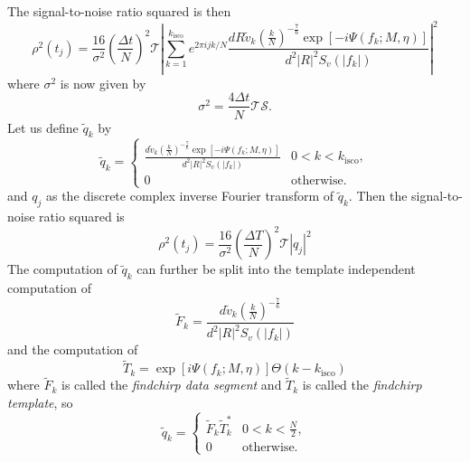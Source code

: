 The signal-to-noise ratio squared is then
\begin{equation}
\rho^2(t_j) = 
\frac{16}{\sigma^2}\left(\frac{\Delta t}{N}\right)^2 \mathcal{T}
\left| 
  \sum_{k=1}^{k_\mathrm{isco}} e^{2\pi ijk/N} 
  \frac{dR\tilde{v}_k \left(\frac{k}{N}\right)^{-\frac{7}{6}} \exp\left[-i\Psi(f_k;M,\eta)\right]}
       {d^2|R|^2 S_v\left(\left|f_k\right|\right)}
\right|^2 
\label{eq:signaltonoisesq}
\end{equation}
where $\sigma^2$ is now given by
\begin{equation}
\sigma^2 = \frac{4\Delta t}{N} \mathcal{T}\mathcal{S}.
\label{eq:sigmasqts}
\end{equation}
Let us define $\tilde{q}_k$ by
\begin{equation}
\label{eq:qtildedef}
\tilde{q}_k = 
\begin{cases}
\frac{d\tilde{v}_k \left(\frac{k}{N}\right)^{-\frac{7}{6}} \exp\left[-i\Psi(f_k;M,\eta)\right]}
     {d^2|R|^2S_v\left(\left|f_k\right|\right)} & 0 < k < k_\mathrm{isco}, \\
0 & \text{otherwise}.
\end{cases}
\end{equation}
and $q_j$ as the discrete complex inverse Fourier transform of $\tilde{q}_k$. Then
the signal-to-noise ratio squared is
\begin{equation}
\rho^2(t_j) = \frac{16}{\sigma^2}\left(\frac{\Delta T}{N}\right)^2 \mathcal{T}
\left|q_j\right|^2
\end{equation}
The computation of $\tilde{q}_k$ can further be split into the template
independent computation of
\begin{equation}
\tilde{F}_k = \frac{d\tilde{v}_k \left(\frac{k}{N}\right)^{-\frac{7}{6}}}
{d^2|R|^2S_v\left(\left|f_k\right|\right)}
\end{equation}
and the computation of
\begin{equation}
\tilde{T}_k = \exp\left[i\Psi(f_k;M,\eta)\right] \Theta\left(k-k_\mathrm{isco}\right)
\end{equation}
where $\tilde{F}_k$ is called the \emph{findchirp data segment} and 
$\tilde{T}_k$ is called the \emph{findchirp template}, so
\begin{equation}
\tilde{q}_k = 
\begin{cases}
\tilde{F}_k \tilde{T}_k^\ast & 0 < k < \frac{N}{2},\\
0 & \text{otherwise}.
\end{cases}
\end{equation}

